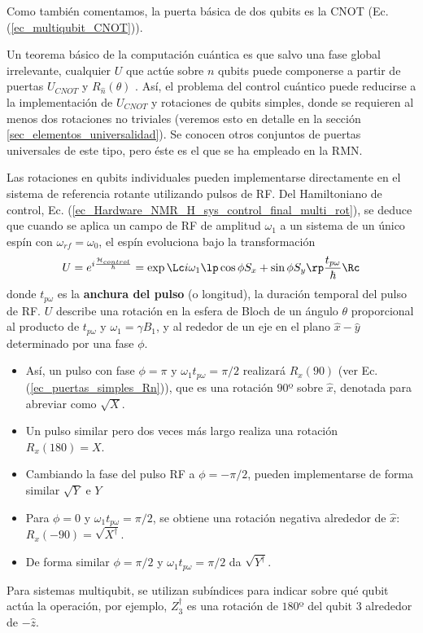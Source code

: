 Como también comentamos, la puerta básica de dos qubits es la CNOT (Ec. (\ref{ec_multiqubit_CNOT})). 

Un teorema básico de la computación cuántica es que salvo una fase global irrelevante, cualquier $U$ que actúe sobre $n$ qubits puede componerse a partir de puertas $U_{CNOT}$ y $R_{\hat{n}}(\theta)$ \cite{bib_nielsen_chuang_2010} . Así, el problema del control cuántico puede reducirse a la implementación de $U_{CNOT}$ y rotaciones de qubits simples, donde se requieren al menos dos rotaciones no triviales (veremos esto en detalle en la sección \ref{sec_elementos_universalidad}). Se conocen otros conjuntos de puertas universales de este tipo, pero éste es el que se ha empleado en la RMN.



Las rotaciones en qubits individuales pueden implementarse directamente en el sistema de referencia rotante utilizando pulsos de RF. Del Hamiltoniano de control, Ec. (\ref{ec_Hardware_NMR_H_sys_control_final_multi_rot}), se deduce que cuando se aplica un campo de RF de amplitud $\omega_1$ a un sistema de un único espín con $\omega_{rf} = \omega_0$, el espín evoluciona bajo la transformación
	\begin{equation} \label{ec_Hardware_NMR_U_arbitrario}
	U = e^{i \frac{\mathcal{H}_{control}}{\hbar}} = \exp \Lc i \omega_1 \lp  \cos \phi S_x + \sin \phi S_y \rp \frac{t_{p \omega}}{\hbar} \Rc
	\end{equation}
donde $t_{p \omega}$ es la \textbf{anchura del pulso} (o longitud), la duración temporal del pulso de RF. $U$ describe una rotación en la esfera de Bloch de un ángulo $\theta$ proporcional al producto de $t_{p\omega}$ y $\omega_1 = \gamma B_1$, y al rededor de un eje en el plano $\hat{x}-\hat{y}$ determinado por una fase $\phi$.

\begin{itemize}
	\item Así, un pulso con fase $\phi = \pi$ y $\omega_1 t_{p\omega} = \pi/2$ realizará $R_x(90)$ (ver Ec. (\ref{ec_puertas_simples_Rn})), que es una rotación $90$º sobre $\hat{x}$, denotada para abreviar como $\sqrt{X}$.
	\item Un pulso similar pero dos veces más largo realiza una rotación $R_x(180) =  X$.
	\item Cambiando la fase del pulso RF a $\phi = -\pi/2$, pueden implementarse de forma similar $\sqrt{Y}$ e $Y$
	\item Para $\phi = 0$ y $\omega_1 t_{p\omega} = \pi/2$, se obtiene una rotación negativa alrededor de $\hat{x}$: $R_x (-90) = \sqrt{X^\dagger}$.
	\item De forma similar $\phi = \pi/2$ y $\omega_1 t_{p\omega} = \pi/2$ da $\sqrt{Y^\dagger}$.
\end{itemize}
Para sistemas multiqubit, se utilizan subíndices para indicar sobre qué qubit actúa la operación, por ejemplo, $Z^\dagger_3$ es una rotación de $180$º del qubit 3 alrededor de $- \hat{z}$.

